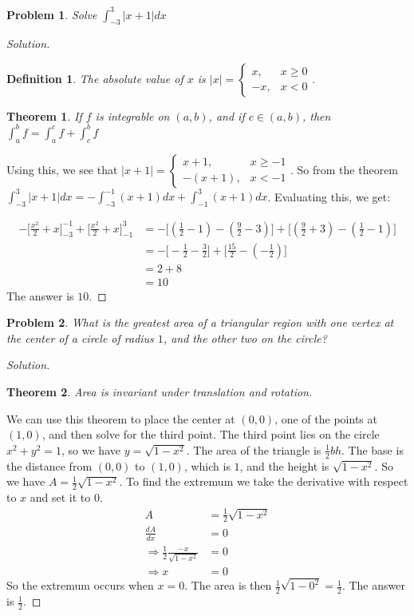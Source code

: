 \documentclass[12pt,oneside]{book}
\theoremstyle{mystyle}
\newtheorem{problem}{Problem}[section]
\newtheorem*{theorem*}{Theorem}
\newtheorem*{definition*}{Definition}
\begin{document}
\begin{problem}
Solve $\int_{-3}^{3}|x+1|dx$
\end{problem}
\begin{proof}[Solution]
\begin{definition*}
The absolute value of $x$ is $|x| = \begin{cases}x, & x\geq 0 \\ -x, & x<0\end{cases}$.
\end{definition*}
\begin{theorem*}
If $f$ is integrable on $(a,b)$, and if $c\in (a,b)$, then $\int_{a}^{b} f = \int_{a}^{c}f + \int_{c}^{b} f$
\end{theorem*}
\noindent Using this, we see that $|x+1| = \begin{cases} x+1, & x\geq -1 \\ -(x+1), & x < -1\end{cases}$. So from the theorem $\int_{-3}^{3}|x+1|dx = -\int_{-3}^{-1}(x+1)dx + \int_{-1}^{3}(x+1)dx$. Evaluating this, we get:

\begin{align}
    \nonumber -\bigg[\frac{x^2}{2}+x\bigg]_{-3}^{-1} + \bigg[\frac{x^2}{2}+x\bigg]_{-1}^{3} &= -\bigg[(\frac{1}{2} - 1) - (\frac{9}{2} - 3)\bigg] + \bigg[(\frac{9}{2} + 3) - (\frac{1}{2} - 1)\bigg] \\
    \nonumber &= -\bigg[-\frac{1}{2} - \frac{3}{2}\bigg] + \bigg[\frac{15}{2} - (-\frac{1}{2})\bigg] \\
    \nonumber &= 2 + 8 \\ 
    \nonumber &= 10
\end{align}
The answer is $10$.
\end{proof}

\begin{problem}
What is the greatest area of a triangular region with one vertex at the center of a circle of radius $1$, and the other two on the circle?
\end{problem}
\begin{proof}[Solution]
\begin{theorem*}
Area is invariant under translation and rotation.
\end{theorem*}
We can use this theorem to place the center at $(0,0)$, one of the points at $(1,0)$, and then solve for the third point. The third point lies on the circle $x^2+y^2 = 1$, so we have $y = \sqrt{1-x^2}$. The area of the triangle is $\frac{1}{2}bh$. The base is the distance from $(0,0)$ to $(1,0)$, which is $1$, and the height is $\sqrt{1-x^2}$. So we have $A = \frac{1}{2}\sqrt{1-x^2}$. To find the extremum we take the derivative with respect to $x$ and set it to $0$.
\begin{align}
    \nonumber A &= \frac{1}{2}\sqrt{1-x^2} \\
    \nonumber \frac{dA}{dx} &= 0 \\
    \nonumber \Rightarrow \frac{1}{2}\frac{-x}{\sqrt{1-x^2}} &=0 \\
    \nonumber \Rightarrow x &= 0
\end{align}
So the extremum occurs when $x=0$. The area is then $\frac{1}{2}\sqrt{1-0^2} = \frac{1}{2}$. The answer is $\frac{1}{2}$.
\end{proof}
\end{document}
